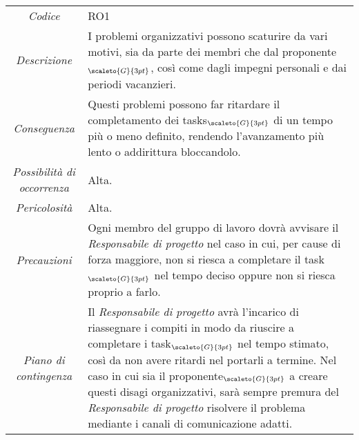{{{{	\begin{center}
		\renewcommand{\arraystretch}{1.4}
		\begin{tabularx}{\textwidth}{|c|X|}
			\hline
			\rowcolor{airforceblue}
			\multicolumn{2}{|c|}{\textit{Problemi organizzativi}}\\
			\hline
			\textit{Codice} & RO1 \\
			\hline
			\textit{Descrizione} & I problemi organizzativi possono scaturire da vari motivi, sia da parte dei membri che dal proponente$_{\scaleto{G}{3pt}}$, così come dagli impegni personali e dai periodi vacanzieri.  \\
			\hline
			\textit{Conseguenza} & Questi problemi possono far ritardare il completamento dei tasks$_{\scaleto{G}{3pt}}$ di un tempo più o meno definito, rendendo l'avanzamento più lento o addirittura bloccandolo. \\
			\hline
			\textit{Possibilità di occorrenza} & Alta. \\
			\hline
			\textit{Pericolosità} & Alta. \\
			\hline
			\textit{Precauzioni} & Ogni membro del gruppo di lavoro dovrà avvisare il \textit{Responsabile di progetto} nel caso in cui, per cause di forza maggiore, non si riesca a completare il task$_{\scaleto{G}{3pt}}$ nel tempo deciso oppure non si riesca proprio a farlo. \\
			\hline
			\textit{Piano di contingenza} & Il \textit{Responsabile di progetto} avrà l'incarico di riassegnare i compiti in modo da riuscire a completare i task$_{\scaleto{G}{3pt}}$ nel tempo stimato, così da non avere ritardi nel portarli a termine.
			Nel caso in cui sia il proponente$_{\scaleto{G}{3pt}}$ a creare questi disagi organizzativi, sarà sempre premura del \textit{Responsabile di progetto} risolvere il problema mediante i canali di comunicazione adatti.  \\
			\hline
		\end{tabularx}
	\end{center}


\def\tabularxcolumn#1{m{#1}}
{
	
}}}}}
